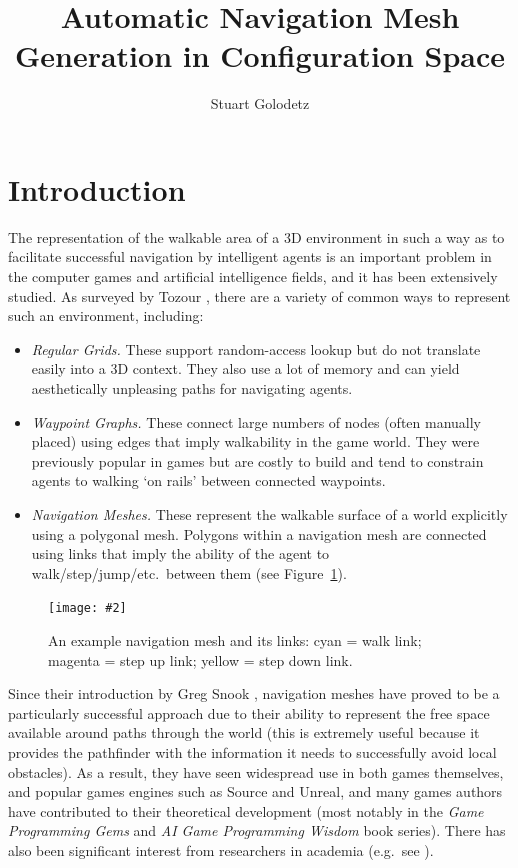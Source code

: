 \documentclass[10pt,twocolumn]{article}
\newcommand{\stufigex}[5]					%
{
	\begin{figure}[#5]
	\begin{center}
		\texttt{[image: \#2]}
		\caption{#3}
		\label{#4}
	\end{center}
	\end{figure}
}
\begin{document}
\title{Automatic Navigation Mesh Generation in Configuration Space}
\author{Stuart Golodetz}
\date{}
\maketitle

\section{Introduction}

The representation of the walkable area of a 3D environment in such a way as to facilitate successful navigation by intelligent agents is an important problem in the computer games and artificial intelligence fields, and it has been extensively studied. As surveyed by Tozour \cite{tozour04}, there are a variety of common ways to represent such an environment, including:
%
\begin{itemize}
\item \emph{Regular Grids.} These support random-access lookup but do not translate easily into a 3D context. They also use a lot of memory and can yield aesthetically unpleasing paths for navigating agents.
\item \emph{Waypoint Graphs.} These connect large numbers of nodes (often manually placed) using edges that imply walkability in the game world. They were previously popular in games but are costly to build and tend to constrain agents to walking `on rails' between connected waypoints.
\item \emph{Navigation Meshes.} These represent the walkable surface of a world explicitly using a polygonal mesh. Polygons within a navigation mesh are connected using links that imply the ability of the agent to walk/step/jump/etc.\ between them (see Figure~\ref{fig:navmeshexample}).
\end{itemize}

\stufigex{width=.9\linewidth}{blakeney-upperramp-clearer.png}{An example navigation mesh and its links: cyan = walk link; magenta = step up link; yellow = step down link.}{fig:navmeshexample}{t}

\noindent Since their introduction by Greg Snook \cite{snook00}, navigation meshes have proved to be a particularly successful approach due to their ability to represent the free space available around paths through the world (this is extremely useful because it provides the pathfinder with the information it needs to successfully avoid local obstacles). As a result, they have seen widespread use in both games themselves, and popular games engines such as Source and Unreal, and many games authors have contributed to their theoretical development (most notably in the \emph{Game Programming Gems} and \emph{AI Game Programming Wisdom} book series). There has also been significant interest from researchers in academia (e.g.~see \cite{hale09,kallmann10,pettre05,vantoll11}).
\end{document}
